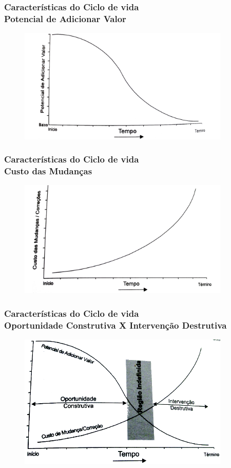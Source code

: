 \begin{frame}
 \frametitle{Características do Ciclo de vida \\  Potencial de Adicionar Valor}
  \begin{figure}
 \centering
 \includegraphics[width = 0.9\textwidth]{figs/fig5.png}
  \end{figure}
\end{frame}

\begin{frame}
 \frametitle{Características do Ciclo de vida  \\ Custo das Mudanças}
  \begin{figure}
 \centering
 \includegraphics[width = 0.9\textwidth]{figs/fig6.png}
\end{figure}
\end{frame}

\begin{frame}
 \frametitle{Características do Ciclo de vida  \\ \small{Oportunidade Construtiva X Intervenção Destrutiva}}
  \begin{figure}
 \centering
 \includegraphics[width = 0.9\textwidth]{figs/fig21.png}
\end{figure}
\end{frame}


